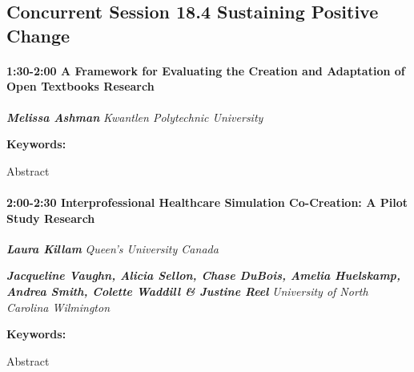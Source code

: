 \documentclass[
]{book}
\begin{document}
\hypertarget{concurrent-session-18.4-sustaining-positive-change}{%
\subsection*{Concurrent Session 18.4 \textbar{} Sustaining Positive Change}\label{concurrent-session-18.4-sustaining-positive-change}}

\begin{session}
\hypertarget{a-framework-for-evaluating-the-creation-and-adaptation-of-open-textbooks-research}{%
\paragraph*{\texorpdfstring{1:30-2:00 \textbar{} \textbf{A Framework for
Evaluating the Creation and Adaptation of Open Textbooks} \textbar{}
Research}{1:30-2:00 \textbar{} A Framework for Evaluating the Creation and Adaptation of Open Textbooks \textbar{} Research}}\label{a-framework-for-evaluating-the-creation-and-adaptation-of-open-textbooks-research}}

\textbf{\emph{Melissa Ashman}} \textbar{} \emph{Kwantlen Polytechnic
University}

\textbf{Keywords:}

Abstract
\end{session}

\begin{session}
\hypertarget{interprofessional-healthcare-simulation-co-creation-a-pilot-study-research}{%
\paragraph*{\texorpdfstring{2:00-2:30 \textbar{}
\textbf{Interprofessional Healthcare Simulation Co-Creation: A Pilot
Study} \textbar{}
Research}{2:00-2:30 \textbar{} Interprofessional Healthcare Simulation Co-Creation: A Pilot Study \textbar{} Research}}\label{interprofessional-healthcare-simulation-co-creation-a-pilot-study-research}}

\textbf{\emph{Laura Killam}} \textbar{} \emph{Queen's University Canada}

\textbf{\emph{Jacqueline Vaughn, Alicia Sellon, Chase DuBois, Amelia
Huelskamp, Andrea Smith, Colette Waddill \& Justine Reel}} \textbar{}
\emph{University of North Carolina Wilmington}

\textbf{Keywords:}

Abstract
\end{session}
\end{document}
